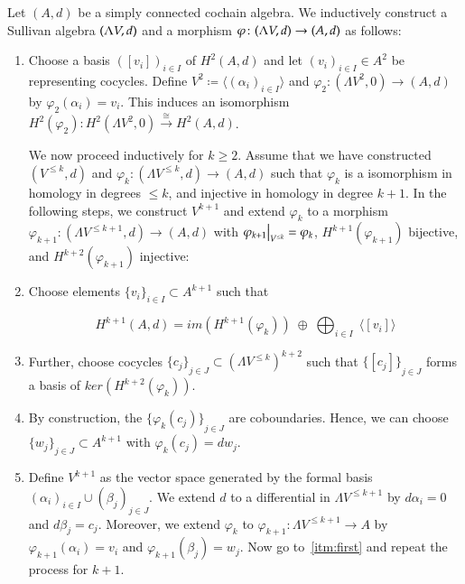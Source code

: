 \begin{Algorithm}
\label{alg:ConstructionOfMinimalSullivanAlgebra}
 Let $(A,d)$ be a simply connected cochain algebra. We inductively construct a Sullivan algebra $(\Lambda V,d)$ and a morphism
 $\varphi \colon (\Lambda V,d) \to (A,d)$ as follows:
 
 \begin{enumerate}
	 \item\label{itm:FirstAlgorithmStep} Choose a basis ${([v_i])}_{i \in I}$ of $H^2(A,d)$ and let 
	 ${(v_i)}_{i \in I} \in A^2$ be representing cocycles.
	  Define $V^2 \coloneqq \langle {(\alpha_i)}_{i \in I} \rangle$ and
  $\varphi_2 \colon (\Lambda V^2,0) \to (A,d)$ by $\varphi_2(\alpha_i) = v_i$.
  This induces an isomorphism 
  $H^2(\varphi_2) \colon H^2(\Lambda V^2, 0) \overset{\cong}{\to} H^2(A,d)$.
   
   We now proceed inductively for $k \geq 2$. Assume that we have constructed $(V^{\leq k}, d)$ and
   ${\varphi_k \colon (\Lambda V^{\leq k}, d) \to (A,d)}$ such that $\varphi_k$ is a isomorphism in homology in degrees $\leq k$,
   and injective in homology in degree $k+1$.
   In the following steps, we construct $V^{k+1}$ and 
   extend $\varphi_k$ to a morphism $\varphi_{k+1} \colon (\Lambda V^{\leq k+1}, d) \to (A,d)$ with 
   $ \restr{\varphi_{k+1}}{V^{\leq k}} = \varphi_k$,
   $H^{k+1}(\varphi_{k+1})$ bijective, and $H^{k + 2}(\varphi_{k+1})$ injective:
   
   \item\label{itm:first} Choose elements ${\lbrace v_i \rbrace}_{i \in I} \subset A^{k+1}$ such that
   
   $$H^{k+1}(A,d) = im ( H^{k+1}(\varphi_k)) \; \oplus \; \bigoplus_{i \in I} \; \langle [v_i] \rangle $$
   
   \item\label{itm:third} Further, choose cocycles ${ \lbrace c_j \rbrace}_{j \in J} \subset {(\Lambda V^{\leq k})}^{k+2}$
   such that ${ \lbrace [c_j] \rbrace}_{j \in J}$ forms a basis of $ker ( H^{k+2}(\varphi_k))$.
   
   \item By construction, the ${\lbrace \varphi_k(c_j) \rbrace}_{j \in J}$ are coboundaries. Hence, we can choose 
   ${\lbrace w_j \rbrace}_{j \in J} \subset A^{k+1}$ with $\varphi_k (c_j) = d{w_j}$.
   
   \item\label{itm:second} Define 
   $V^{k+1}$ as the vector space generated by the formal basis $(\alpha_i)_{i \in I} \cup (\beta_j)_{j \in J}$. We extend $d$
   to a differential in $\Lambda V^{\leq k+1}$ by $d \alpha_i = 0$ and $d \beta_j = c_j$. Moreover, we extend $\varphi_k$
   to $\varphi_{k+1} \colon \Lambda V^{ \leq k+1} \to A$ by $\varphi_{k+1} (\alpha_i) = v_i$ and 
   $\varphi_{k+1} (\beta_j) = w_j$. Now go to~\ref{itm:first} and repeat the process for $k+1$.
 \end{enumerate}

\end{Algorithm}
